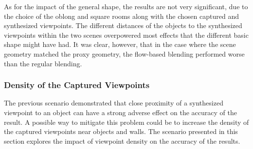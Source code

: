 As for the impact of the general shape, the results are not very significant, due to the choice of the oblong and square rooms along with the chosen captured and synthesized viewpoints. The different distances of the objects to the synthesized viewpoints within the two scenes overpowered most effects that the different basic shape might have had. It was clear, however, that in the case where the scene geometry matched the proxy geometry, the flow-based blending performed worse than the regular blending.























\subsubsection{Density of the Captured Viewpoints}
The previous scenario demonstrated that close proximity of a synthesized viewpoint to an object can have a strong adverse effect on the accuracy of the result. A possible way to mitigate this problem could be to increase the density of the captured viewpoints near objects and walls. The scenario presented in this section explores the impact of viewpoint density on the accuracy of the results.

